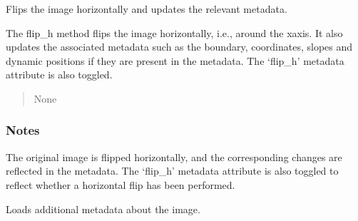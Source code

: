 \documentclass[letterpaper,10pt,english]{sphinxmanual}
\begin{document}
\begin{fulllineitems}
\begin{fulllineitems}
\end{fulllineitems}


\begin{fulllineitems}
\label{\detokenize{forensicfit.core.tape:forensicfit.core.tape.TapeAnalyzer.flip_h}}
\pysigstartsignatures
{}
\pysigstopsignatures
\sphinxAtStartPar
Flips the image horizontally and updates the relevant metadata.

\sphinxAtStartPar
The flip\_h method flips the image horizontally, i.e., around the x\sphinxhyphen{}axis. It also updates the associated
metadata such as the boundary, coordinates, slopes and dynamic positions if they are present in the metadata.
The ‘flip\_h’ metadata attribute is also toggled.
\begin{quote}\begin{description}
\sphinxAtStartPar
{} \textendash{} 

\sphinxAtStartPar
None

\end{description}\end{quote}
\subsubsection*{Notes}

\sphinxAtStartPar
The original image is flipped horizontally, and the corresponding changes are reflected in the metadata. The ‘flip\_h’
metadata attribute is also toggled to reflect whether a horizontal flip has been performed.

\end{fulllineitems}


\begin{fulllineitems}
\label{\detokenize{forensicfit.core.tape:forensicfit.core.tape.TapeAnalyzer.load_metadata}}
\pysigstartsignatures
{}
\pysigstopsignatures
\sphinxAtStartPar
Loads additional metadata about the image.


\end{fulllineitems}
\end{fulllineitems}
\end{document}
